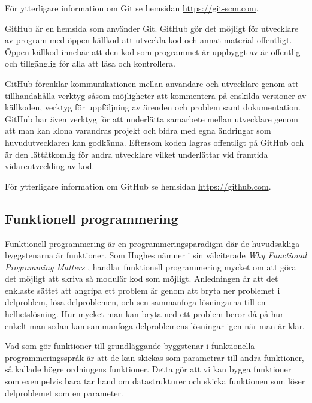 \documentclass[12pt,a4paper,twoside,openright]{article}
\begin{document}
För ytterligare information om Git se hemsidan
\url{https://git-scm.com}.

GitHub är en hemsida som använder Git. GitHub gör det möjligt för
utvecklare av program med öppen källkod att utveckla kod och annat
material offentligt. Öppen källkod innebär att den kod som programmet
är uppbyggt av är offentlig och tillgänglig för alla att läsa och
kontrollera.

GitHub förenklar kommunikationen mellan användare och utvecklare genom
att tillhandahålla verktyg såsom möjligheter att kommentera
på enskilda versioner av källkoden, verktyg för uppföljning av ärenden
och problem samt dokumentation. GitHub har även verktyg för att
underlätta samarbete mellan utvecklare genom att man kan klona
varandras projekt och bidra med egna ändringar som huvudutvecklaren
kan godkänna. Eftersom koden lagras offentligt på GitHub och är den
lättåtkomlig för andra utvecklare vilket underlättar vid framtida
vidareutveckling av kod.

För ytterligare information om GitHub se hemsidan
\url{https://github.com}.

\subsection{Funktionell programmering}
Funktionell programmering är en programmeringsparadigm där de
huvudsakliga byggstenarna är funktioner. Som Hughes nämner i sin
välciterade \textit{Why Functional Programming Matters}
\cite{hughes1989functional}, handlar funktionell programmering mycket
om att göra det möjligt att skriva så modulär kod som möjligt.
Anledningen är att det enklaste sättet att angripa ett problem är
genom att bryta ner problemet i delproblem, lösa delproblemen, och sen
sammanfoga lösningarna till en helhetslösning.  Hur mycket man kan
bryta ned ett problem beror då på hur enkelt man sedan kan sammanfoga
delproblemens lösningar igen när man är klar.

Vad som gör funktioner till grundläggande byggstenar i funktionella
programmeringsspråk är att de kan skickas som parametrar till andra
funktioner, så kallade högre ordningens funktioner. Detta gör att vi
kan bygga funktioner som exempelvis bara tar hand om datastrukturer
och skicka funktionen som löser delproblemet som en parameter.
\end{document}
